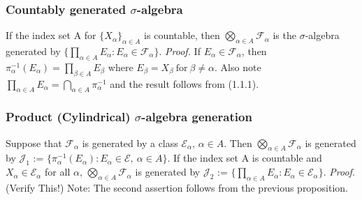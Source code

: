\documentclass{article}
\begin{document}
\subsubsection{Countably generated $\sigma$-algebra}
If the index set A for $\{X_\alpha\}_{\alpha\in A}$ is countable, then $\bigotimes_{\alpha\in A}\mathcal{F}_{\alpha}$ is the $\sigma$-algebra generated by $\{\prod_{\alpha \in A}E_{\alpha}:E_{\alpha} \in \mathcal{F}_{\alpha}\}$. \newline \newline
\textit{Proof.} \newline \newline
If $E_{\alpha} \in \mathcal{F}_{\alpha}$, then $\pi^{-1}_{\alpha}(E_{\alpha})=\prod_{\beta \in A}E_{\beta}$ where $E_{\beta} = X_{\beta} \ \text{for} \ \beta \neq \alpha$. Also note $\prod_{\alpha \in A}E_{\alpha}=\bigcap_{\alpha \in A}\pi^{-1}_{\alpha}$ and the result follows from (1.1.1).

\subsubsection{Product (Cylindrical) $\sigma$-algebra generation}
Suppose that $\mathcal{F}_{\alpha}$ is generated by a class $\mathcal{E}_{\alpha}$, $\alpha \in A$. Then $\bigotimes_{\alpha \in A}\mathcal{F}_{\alpha}$ is generated by $\mathcal{J}_1$ := $\{\pi^{-1}_{\alpha}(E_{\alpha}):E_{\alpha}\in \mathcal{E},\ \alpha \in A \}$. If the index set A is countable and $X_{\alpha}\in \mathcal{E}_{\alpha}$ for all $\alpha$, $\bigotimes_{\alpha \in A} \mathcal{F}_{\alpha}$ is generated by $\mathcal{J}_2$ := $\{\prod_{\alpha \in A}E_{\alpha}:E_{\alpha} \in \mathcal{E}_{\alpha} \}.$\newline \newline
\textit{Proof.}\newline \newline
(Verify This!)\newline \newline
Note: The second assertion follows from the previous proposition.
\end{document}
